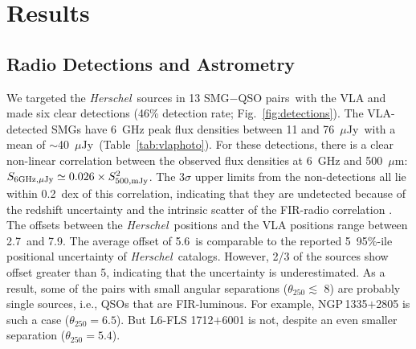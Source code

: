 \documentclass[iop,revtex4,twocolumn,apj,numberedappendix,appendixfloats]{emulateapj}
\newcommand{\hers}{{\it Herschel}}
\newcommand{\um}{$\mu$m}
\newcommand{\uJy}{$\mu$Jy}
\newcommand{\sqps}{SMG$-$QSO pairs}
\begin{document}
\section{Results} \label{sec:result}

\subsection{Radio Detections and Astrometry}


We targeted the \hers\ sources in 13 \sqps\ with the VLA and made six clear detections (46\% detection rate; Fig.~\ref{fig:detections}). The VLA-detected SMGs have 6~GHz peak flux densities between 11 and 76~\uJy\ with a mean of $\sim$40~\uJy\ (Table~\ref{tab:vlaphoto}). For these detections, there is a clear non-linear correlation between the observed flux densities at 6~GHz and 500~\um: 
$S_{\rm 6GHz,\mu Jy} \simeq 0.026 \times S_{\rm 500,mJy}^2$. The 3$\sigma$ upper limits from the non-detections all lie within 0.2~dex of this correlation, indicating that they are undetected because of the redshift uncertainty and the intrinsic scatter of the FIR-radio correlation \citep[e.g.][]{Ivison10c}. 
%
%
%
The offsets between the \hers\ positions and the VLA positions range between 2.7\arcsec\ and 7.9\arcsec. The average offset of 5.6\arcsec\ is comparable to the reported 5\arcsec\ 95\%-ile positional uncertainty of \hers\ catalogs. However, 2/3 of the sources show offset greater than 5\arcsec, indicating that the uncertainty is underestimated. As a result, some of the pairs with small angular separations ($\theta_{250} \lesssim$ 8\arcsec) are probably single sources, i.e., QSOs that are FIR-luminous. For example, NGP\,1335$+$2805 is such a case ($\theta_{250} = 6.5$\arcsec). But L6-FLS 1712$+$6001 is not, despite an even smaller separation ($\theta_{250} = 5.4$\arcsec). 
\end{document}
